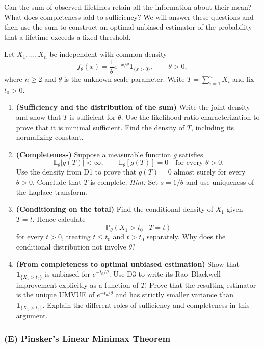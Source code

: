 Can the sum of observed lifetimes retain all the information about their mean? What does completeness
add to sufficiency? We will answer these questions and then use the sum to construct an optimal unbiased
estimator of the probability that a lifetime exceeds a fixed threshold.

Let $X_1,\ldots,X_n$ be independent with common density
\[
 f_\theta(x)=\frac1\theta e^{-x/\theta}\mathbf1_{\{x>0\}},\qquad\theta>0,
\]
where $n\ge2$ and $\theta$ is the unknown scale parameter. Write $T=\sum_{i=1}^nX_i$ and fix $t_0>0$.

\begin{enumerate}[label=\textcolor{AccentInk}{\sffamily\bfseries D\arabic*.},ref=D\arabic*,leftmargin=2.65em,labelsep=0.65em,itemsep=1em]
\item \textbf{(Sufficiency and the distribution of the sum)} Write the joint density and show that $T$ is sufficient for $\theta$. Use the likelihood-ratio characterization to prove that it is minimal sufficient. Find the density of $T$, including its normalizing constant.

\item \textbf{(Completeness)} Suppose a measurable function $g$ satisfies
\[
 \mathbb E_\theta|g(T)|<\infty,\qquad\mathbb E_\theta[g(T)]=0\quad\text{for every }\theta>0.
\]
Use the density from D1 to prove that $g(T)=0$ almost surely for every $\theta>0$. Conclude that $T$ is complete. \emph{Hint:} Set $s=1/\theta$ and use uniqueness of the Laplace transform.

\item \textbf{(Conditioning on the total)} Find the conditional density of $X_1$ given $T=t$. Hence calculate
\[
 \mathbb P_\theta(X_1>t_0\mid T=t)
\]
for every $t>0$, treating $t\le t_0$ and $t>t_0$ separately. Why does the conditional distribution not involve $\theta$?

\item \textbf{(From completeness to optimal unbiased estimation)} Show that $\mathbf1_{\{X_1>t_0\}}$ is unbiased for $e^{-t_0/\theta}$. Use D3 to write its Rao--Blackwell improvement explicitly as a function of $T$. Prove that the resulting estimator is the unique UMVUE of $e^{-t_0/\theta}$ and has strictly smaller variance than $\mathbf1_{\{X_1>t_0\}}$. Explain the different roles of sufficiency and completeness in this argument.
\end{enumerate}

\subsubsection*{(E) Pinsker's Linear Minimax Theorem}
{}
\label{ex:pinsker-linear-minimax}

